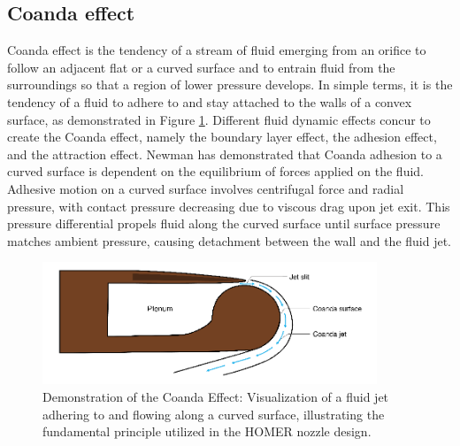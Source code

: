 \subsection{Coanda effect}
Coanda effect is the tendency of a stream of fluid emerging from an orifice to follow an adjacent flat or a curved surface and to entrain fluid from the surroundings so that a region of lower pressure develops. In simple terms, it is the tendency of a fluid to adhere to and stay attached to the walls of a convex surface, as demonstrated in Figure \ref{fig:Coanda}. Different fluid dynamic effects concur to create the Coanda effect, namely the boundary layer effect, the adhesion effect, and the attraction effect. Newman \cite{newman} has demonstrated that Coanda adhesion to a curved surface is dependent on the equilibrium of forces applied on the fluid. Adhesive motion on a curved surface involves centrifugal force and radial pressure, with contact pressure decreasing due to viscous drag upon jet exit. This pressure differential propels fluid along the curved surface until surface pressure matches ambient pressure, causing detachment between the wall and the fluid jet. 
\begin{figure}[ht]
    \centering
    \includegraphics[width=10cm]{images/Theory-CFD/Coanda-effect.png}
    \caption{Demonstration of the Coanda Effect: Visualization of a fluid jet adhering to and flowing along a curved surface, illustrating the fundamental principle utilized in the HOMER nozzle design.}
    \label{fig:Coanda}
  \end{figure}
